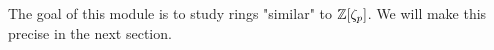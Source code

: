 The goal of this module is to study rings "similar" to $\mathbb{Z}\!\left[ \zeta_p \right]$. We will make this precise in the next section.

% 
% 
% 
% 